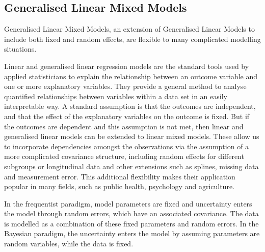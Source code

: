 \subsection{Generalised Linear Mixed Models}
Generalised Linear Mixed Models, an extension of Generalised Linear Models to include both fixed and random
effects, are flexible to many complicated modelling situations.

Linear and generalised linear regression models are the standard tools used by applied statisticians to
explain the relationship between an outcome variable and one or more explanatory variables. They provide a
general method  to analyse quantified relationships between variables within a data set in an easily
interpretable way. A standard assumption is that the outcomes are independent, and that the effect of the
explanatory variables on the outcome is fixed. But if the outcomes are dependent and this assumption is not
met, then linear and generalised linear models can be extended to linear mixed models. These allow us to
incorporate dependencies amongst the  observations via the assumption of a more complicated covariance
structure, including random effects for  different subgroups or longitudinal data and other extensions such as
splines, missing data and measurement error. This additional flexibility makes their application popular in
many fields, such as public health, psychology and agriculture.

In the frequentist paradigm, model parameters are fixed and uncertainty enters the model through random
errors, which have an associated covariance. The data is modelled as a combination of these fixed parameters
and random errors. In the Bayesian paradigm, the uncertainty enters the model by assuming parameters are
random variables, while the data is fixed.

